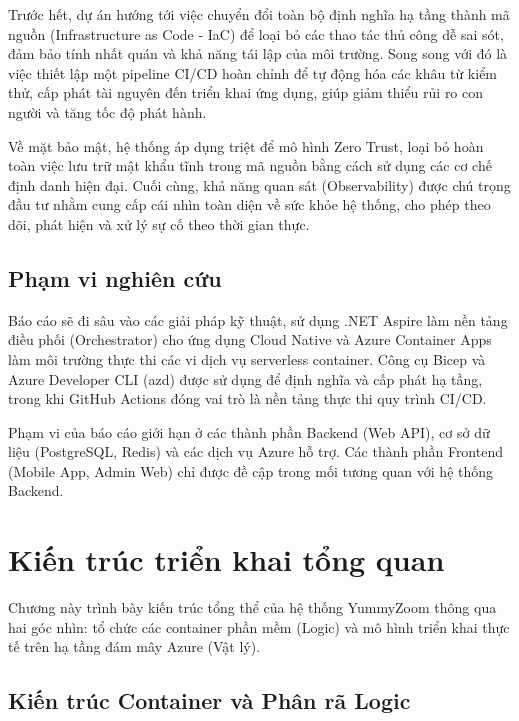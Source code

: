 \documentclass[a4paper,12pt,twoside]{report}
\begin{document}
Trước hết, dự án hướng tới việc chuyển đổi toàn bộ định nghĩa hạ tầng thành mã nguồn (Infrastructure as Code - IaC) để loại bỏ các thao tác thủ công dễ sai sót, đảm bảo tính nhất quán và khả năng tái lập của môi trường. Song song với đó là việc thiết lập một pipeline CI/CD hoàn chỉnh để tự động hóa các khâu từ kiểm thử, cấp phát tài nguyên đến triển khai ứng dụng, giúp giảm thiểu rủi ro con người và tăng tốc độ phát hành.

Về mặt bảo mật, hệ thống áp dụng triệt để mô hình Zero Trust, loại bỏ hoàn toàn việc lưu trữ mật khẩu tĩnh trong mã nguồn bằng cách sử dụng các cơ chế định danh hiện đại. Cuối cùng, khả năng quan sát (Observability) được chú trọng đầu tư nhằm cung cấp cái nhìn toàn diện về sức khỏe hệ thống, cho phép theo dõi, phát hiện và xử lý sự cố theo thời gian thực.

\section{Phạm vi nghiên cứu}

Báo cáo sẽ đi sâu vào các giải pháp kỹ thuật, sử dụng .NET Aspire làm nền tảng điều phối (Orchestrator) cho ứng dụng Cloud Native và Azure Container Apps làm môi trường thực thi các vi dịch vụ serverless container. Công cụ Bicep và Azure Developer CLI (azd) được sử dụng để định nghĩa và cấp phát hạ tầng, trong khi GitHub Actions đóng vai trò là nền tảng thực thi quy trình CI/CD.

Phạm vi của báo cáo giới hạn ở các thành phần Backend (Web API), cơ sở dữ liệu (PostgreSQL, Redis) và các dịch vụ Azure hỗ trợ. Các thành phần Frontend (Mobile App, Admin Web) chỉ được đề cập trong mối tương quan với hệ thống Backend.


\chapter{Kiến trúc triển khai tổng quan}
\label{chap:arch}

Chương này trình bày kiến trúc tổng thể của hệ thống YummyZoom thông qua hai góc nhìn: tổ chức các container phần mềm (Logic) và mô hình triển khai thực tế trên hạ tầng đám mây Azure (Vật lý).

\section{Kiến trúc Container và Phân rã Logic}
\end{document}
